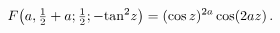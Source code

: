 \[\mathop{F\/}\nolimits\!\left(a,\tfrac{1}{2}+a;\tfrac{1}{2};-{\mathop{\tan\/}%
\nolimits^{2}}z\right)=(\mathop{\cos\/}\nolimits z)^{2a}\mathop{\cos\/}%
\nolimits\!\left(2az\right).\]
